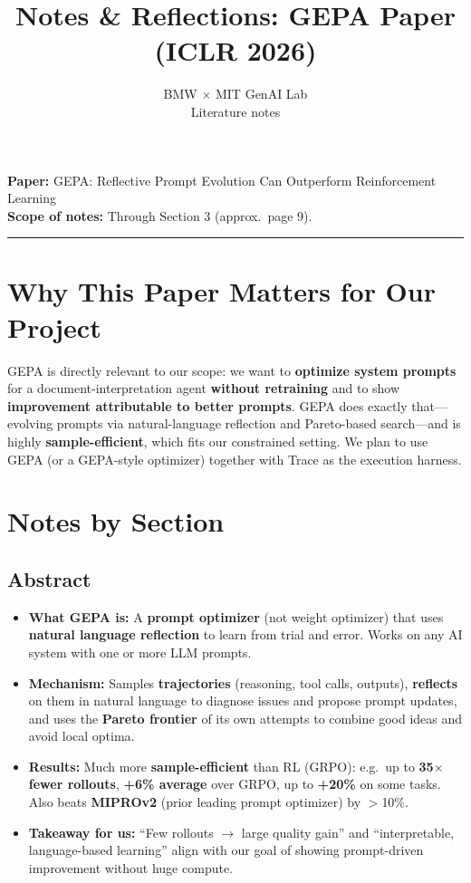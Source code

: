 \documentclass[11pt,a4paper]{article}
\title{Notes \& Reflections: GEPA Paper (ICLR 2026)}
\author{BMW $\times$ MIT GenAI Lab\\Literature notes}
\date{}
\begin{document}
\maketitle
\vspace{0.5em}

\textbf{Paper:} GEPA: Reflective Prompt Evolution Can Outperform Reinforcement Learning\\
\textbf{Scope of notes:} Through Section 3 (approx.\ page 9).

\vspace{0.5em}
\hrule
\vspace{0.5em}

\section{Why This Paper Matters for Our Project}

GEPA is directly relevant to our scope: we want to \textbf{optimize system prompts} for a document-interpretation agent \textbf{without retraining} and to show \textbf{improvement attributable to better prompts}. GEPA does exactly that---evolving prompts via natural-language reflection and Pareto-based search---and is highly \textbf{sample-efficient}, which fits our constrained setting. We plan to use GEPA (or a GEPA-style optimizer) together with Trace as the execution harness.

\section{Notes by Section}

\subsection{Abstract}

\begin{itemize}
  \item \textbf{What GEPA is:} A \textbf{prompt optimizer} (not weight optimizer) that uses \textbf{natural language reflection} to learn from trial and error. Works on any AI system with one or more LLM prompts.
  \item \textbf{Mechanism:} Samples \textbf{trajectories} (reasoning, tool calls, outputs), \textbf{reflects} on them in natural language to diagnose issues and propose prompt updates, and uses the \textbf{Pareto frontier} of its own attempts to combine good ideas and avoid local optima.
  \item \textbf{Results:} Much more \textbf{sample-efficient} than RL (GRPO): e.g.\ up to \textbf{35$\times$ fewer rollouts}, \textbf{+6\% average} over GRPO, up to \textbf{+20\%} on some tasks. Also beats \textbf{MIPROv2} (prior leading prompt optimizer) by $>$10\%.
  \item \textbf{Takeaway for us:} ``Few rollouts $\to$ large quality gain'' and ``interpretable, language-based learning'' align with our goal of showing prompt-driven improvement without huge compute.
\end{itemize}
\end{document}
